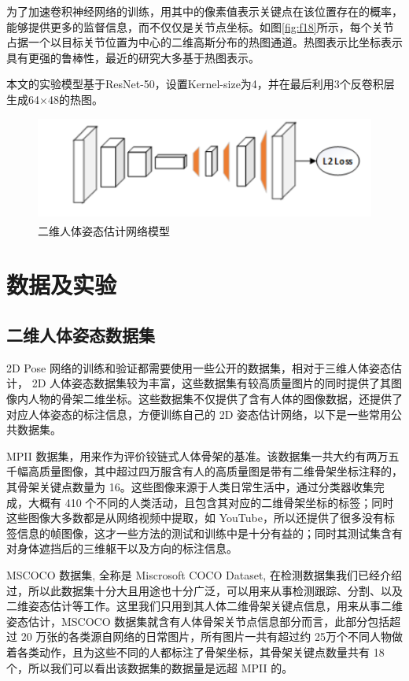 为了加速卷积神经网络的训练，用其中的像素值表示关键点在该位置存在的概率，能够提供更多的监督信息，而不仅仅是关节点坐标。如图\ref{fig:f18}所示，每个关节占据一个以目标关节位置为中心的二维高斯分布的热图通道。热图表示比坐标表示具有更强的鲁棒性，最近的研究大多基于热图表示。

本文的实验模型基于ResNet-50，设置Kernel-size为4，并在最后利用3个反卷积层生成64×48的热图。

\begin{figure}[h]
	\centering
	\includegraphics[scale=0.8]{figures/19.png}
	\caption{二维人体姿态估计网络模型\textsuperscript{\cite{p25}}}
	\label{fig:f19}
\end{figure}



\section{数据及实验}
\subsection{二维人体姿态数据集}{}

2D Pose 网络的训练和验证都需要使用一些公开的数据集，相对于三维人体姿态估计， 2D 人体姿态数据集较为丰富，这些数据集有较高质量图片的同时提供了其图像内人物的骨架二维坐标。这些数据集不仅提供了含有人体的图像数据，还提供了对应人体姿态的标注信息，方便训练自己的 2D 姿态估计网络，以下是一些常用公共数据集。

MPII 数据集，用来作为评价铰链式人体骨架的基准。该数据集一共大约有两万五千幅高质量图像，其中超过四万服含有人的高质量图是带有二维骨架坐标注释的，其骨架关键点数量为 16。这些图像来源于人类日常生活中，通过分类器收集完成，大概有 410 个不同的人类活动，且包含其对应的二维骨架坐标的标签；同时这些图像大多数都是从网络视频中提取，如 YouTube，所以还提供了很多没有标签信息的帧图像，这才一些方法的测试和训练中是十分有益的；同时其测试集含有对身体遮挡后的三维躯干以及方向的标注信息。

MSCOCO 数据集, 全称是 Miscrosoft COCO Dataset, 在检测数据集我们已经介绍过，所以此数据集十分大且用途也十分广泛，可以用来从事检测跟踪、分割、以及二维姿态估计等工作。这里我们只用到其人体二维骨架关键点信息，用来从事二维姿态估计，MSCOCO 数据集就含有人体骨架关节点信息部分而言，此部分包括超过 20 万张的各类源自网络的日常图片，所有图片一共有超过约 25万个不同人物做着各类动作，且为这些不同的人都标注了骨架坐标，其骨架关键点数量共有 18 个，所以我们可以看出该数据集的数据量是远超 MPII 的。

